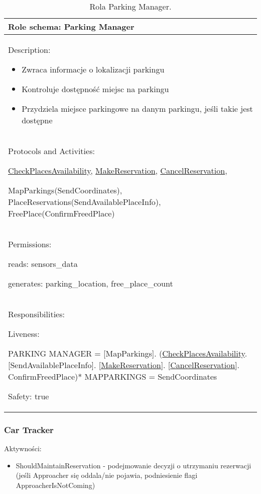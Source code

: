 \begin{table}[!h] \label{tab:rola1} \centering
    \caption{Rola Parking Manager.}
    \begin{tabular} {| p{14cm} |} \hline
        Role schema: Parking Manager \\ \hline
        Description:

        \begin{itemize}
            \item Zwraca informacje o lokalizacji parkingu 
            \item Kontroluje dostępność miejsc na parkingu
            \item Przydziela miejsce parkingowe na danym parkingu, jeśli takie jest dostępne
            
        \end{itemize} \\ \hline
        Protocols and Activities: 
        
        \ul{CheckPlacesAvailability}, \ul{MakeReservation}, \ul{CancelReservation},

        MapParkings(SendCoordinates), PlaceReservations(SendAvailablePlaceInfo), FreePlace(ConfirmFreedPlace) \\ \hline
        Permissions:

        reads: sensors\_data

        generates:  parking\_location, free\_place\_count                                                                                        \\ \hline
        Responsibilities:

        Liveness:

        PARKING MANAGER = [MapParkings]. (\ul{CheckPlacesAvailability}. [SendAvailablePlaceInfo]. [\ul{MakeReservation}]. [\ul{CancelReservation}]. ConfirmFreedPlace)*
MAPPARKINGS = SendCoordinates

        Safety: true \\ \hline
    \end{tabular}
\end{table}

\newpage
\subsubsection{Car Tracker}

Aktywności:
\begin{itemize}
    \item ShouldMaintainReservation - podejmowanie decyzji o utrzymaniu rezerwacji (jeśli Approacher się oddala/nie pojawia, podniesienie flagi ApproacherIsNotComing)
\end{itemize}


